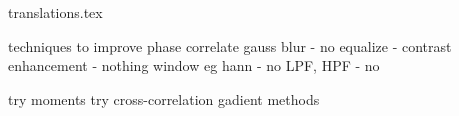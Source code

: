translations.tex

techniques to improve phase correlate
gauss blur - no 
equalize - contrast enhancement - nothing
window eg hann - no
LPF, HPF - no


try moments
try cross-correlation
gadient methods

